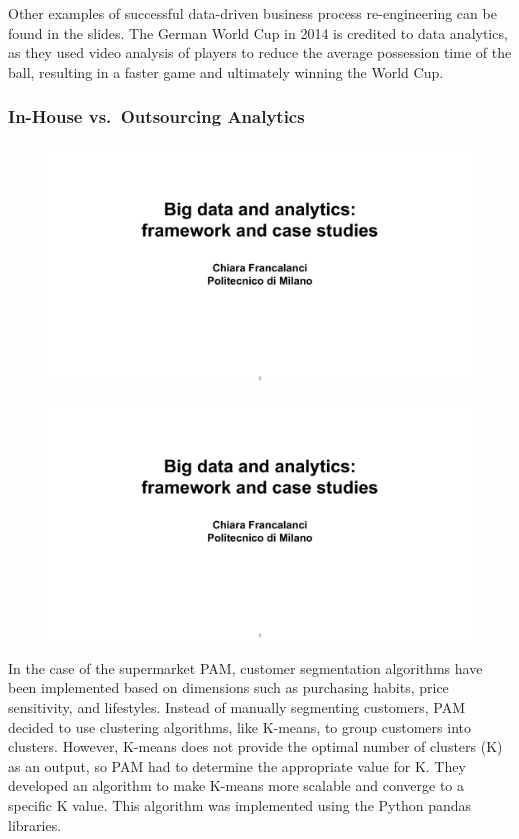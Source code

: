 Other examples of successful data-driven business process re-engineering
can be found in the slides. The German World Cup in 2014 is credited to
data analytics, as they used video analysis of players to reduce the
average possession time of the ball, resulting in a faster game and
ultimately winning the World Cup.

\subsubsection{In-House vs.~Outsourcing Analytics}

\begin{figure}[!h]
  \centering
  \includegraphics[page=71, trim = 1cm 1.5cm 1.5cm 3cm, clip, width=\imagewidth]{images/06 - BIG_DATA.pdf}
\end{figure}

\begin{figure}[!h]
  \centering
  \includegraphics[page=72, trim = 3cm 1cm 1.5cm 3cm, clip, width=\imagewidth]{images/06 - BIG_DATA.pdf}
\end{figure}

In the case of the supermarket PAM, customer segmentation algorithms
have been implemented based on dimensions such as purchasing habits,
price sensitivity, and lifestyles. Instead of manually segmenting
customers, PAM decided to use clustering algorithms, like K-means, to
group customers into clusters. However, K-means does not provide the
optimal number of clusters (K) as an output, so PAM had to determine the
appropriate value for K. They developed an algorithm to make K-means
more scalable and converge to a specific K value. This algorithm was
implemented using the Python pandas libraries.

